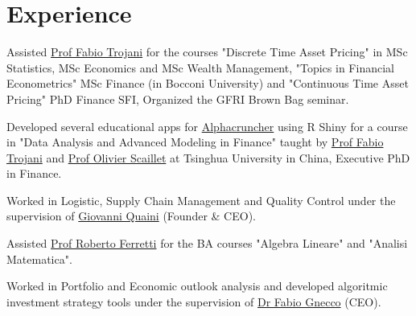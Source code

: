 \documentclass[]{deedy-resume-openfont}
\begin{document}
\begin{minipage}[t]{0.66\textwidth} 


\section{Experience}

\vspace{\topsep} 
Assisted \href{http://www.people.usi.ch/trojanif/}{Prof Fabio Trojani} for the 
courses "Discrete Time Asset Pricing"
in MSc Statistics, MSc Economics and MSc Wealth Management,
"Topics in Financial Econometrics" MSc Finance (in Bocconi University) and
"Continuous Time Asset Pricing" PhD Finance SFI,
Organized the GFRI Brown Bag seminar.
\sectionsep

Developed several educational apps for \href{http://alphacruncher.com/}{Alphacruncher} 
using R Shiny for a course in "Data Analysis and Advanced Modeling in Finance" taught by 
\href{http://www.people.usi.ch/trojanif/}{Prof Fabio Trojani}
and \href{http://www.scaillet.ch/Home_Page_of_Olivier_Scaillet.htm}{Prof Olivier Scaillet}
at Tsinghua University in China, Executive PhD in Finance.
\sectionsep

Worked in Logistic, Supply Chain Management and Quality Control under the supervision
of \href{mailto:gio.quaini@gmail.com}{Giovanni Quaini} (Founder \& CEO).
\sectionsep

Assisted \href{https://www.linkedin.com/in/roberto-ferretti-975697a/}{Prof Roberto Ferretti} 
for the BA courses "Algebra Lineare" and "Analisi Matematica".
\sectionsep

Worked in Portfolio and Economic outlook analysis and
developed algoritmic investment strategy tools under the supervision of
\href{https://www.linkedin.com/in/fabio-gnecco-172b156/}{Dr Fabio Gnecco} (CEO).
\sectionsep


\end{minipage}
\end{document}

